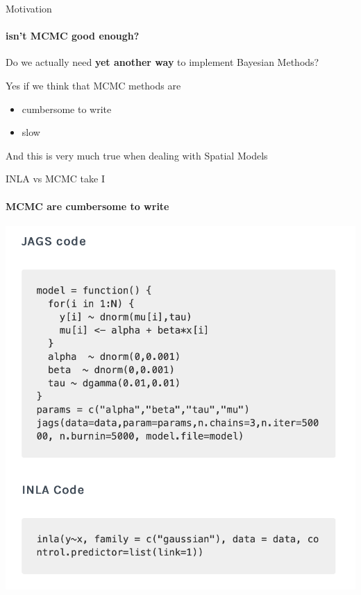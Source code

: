 \documentclass[9pt,ignorenonframetext,]{beamer}
\providecommand{\tightlist}{%
  \setlength{\itemsep}{0pt}\setlength{\parskip}{0pt}}
\begin{document}
\begin{frame}{Motivation}
\protect\hypertarget{motivation}{}

\framesubtitle{isn't MCMC good enough?}

Do we actually need \textbf{yet another way} to implement Bayesian
Methods?

\vspace{0.25cm}

Yes if we think that MCMC methods are

\begin{itemize}
\tightlist
\item
  cumbersome to write
\item
  slow
\end{itemize}

\vspace{0.25cm}

And this is very much true when dealing with Spatial Models

\end{frame}

\begin{frame}{INLA vs MCMC take I}
\protect\hypertarget{inla-vs-mcmc-take-i}{}

\framesubtitle{MCMC are cumbersome to write}

\includegraphics[width=.7\textwidth]{write.png}

\end{frame}
\end{document}
